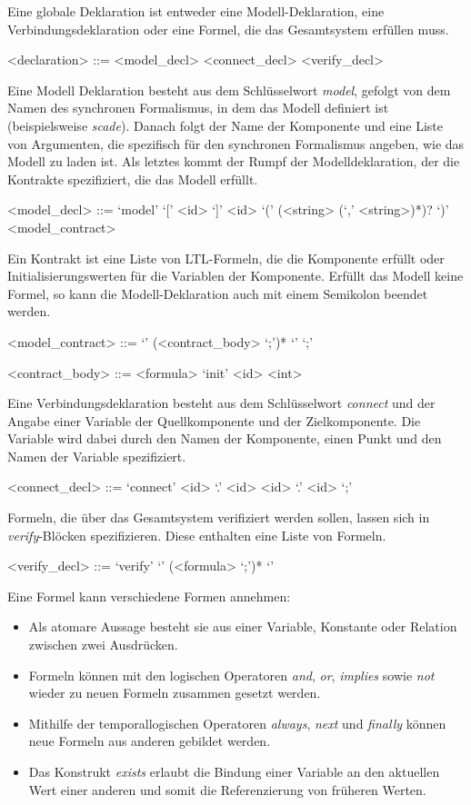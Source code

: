 Eine globale Deklaration ist entweder eine Modell-Deklaration, eine Verbindungsdeklaration oder eine Formel, die das Gesamtsystem erfüllen muss.
\begin{grammar}
  <declaration> ::= <model\_decl>
  \alt <connect\_decl>
  \alt <verify\_decl>
\end{grammar}
Eine Modell Deklaration besteht aus dem Schlüsselwort \emph{model}, gefolgt von dem Namen des synchronen Formalismus, in dem das Modell definiert ist (beispielsweise \emph{scade}).
Danach folgt der Name der Komponente und eine Liste von Argumenten, die spezifisch für den synchronen Formalismus angeben, wie das Modell zu laden ist.
Als letztes kommt der Rumpf der Modelldeklaration, der die Kontrakte spezifiziert, die das Modell erfüllt.
\begin{grammar}
  <model\_decl> ::= `model' `[' <id> `]' <id> `(' (<string> (`,' <string>)*)? `)' <model\_contract>
\end{grammar}
Ein Kontrakt ist eine Liste von LTL-Formeln, die die Komponente erfüllt oder Initialisierungswerten für die Variablen der Komponente.
Erfüllt das Modell keine Formel, so kann die Modell-Deklaration auch mit einem Semikolon beendet werden.
\begin{grammar}
  <model\_contract> ::= `{' (<contract\_body> `;')* `}'
  \alt `;'

  <contract\_body> ::= <formula>
  \alt `init' <id> <int>
\end{grammar}
Eine Verbindungsdeklaration besteht aus dem Schlüsselwort \emph{connect} und der Angabe einer Variable der Quellkomponente und der Zielkomponente.
Die Variable wird dabei durch den Namen der Komponente, einen Punkt und den Namen der Variable spezifiziert.
\begin{grammar}
  <connect\_decl> ::= `connect' <id> `.' <id> <id> `.' <id> `;'
\end{grammar}
Formeln, die über das Gesamtsystem verifiziert werden sollen, lassen sich in \emph{verify}-Blöcken spezifizieren.
Diese enthalten eine Liste von Formeln.
\begin{grammar}
  <verify\_decl> ::= `verify' `{' (<formula> `;')* `}'
\end{grammar}
Eine Formel kann verschiedene Formen annehmen:
\begin{itemize}
\item Als atomare Aussage besteht sie aus einer Variable, Konstante oder Relation zwischen zwei Ausdrücken.
\item Formeln können mit den logischen Operatoren \emph{and}, \emph{or}, \emph{implies} sowie \emph{not} wieder zu neuen Formeln zusammen gesetzt werden.
\item Mithilfe der temporallogischen Operatoren \emph{always}, \emph{next} und \emph{finally} können neue Formeln aus anderen gebildet werden.
\item Das Konstrukt \emph{exists} erlaubt die Bindung einer Variable an den aktuellen Wert einer anderen und somit die Referenzierung von früheren Werten.
\end{itemize}
